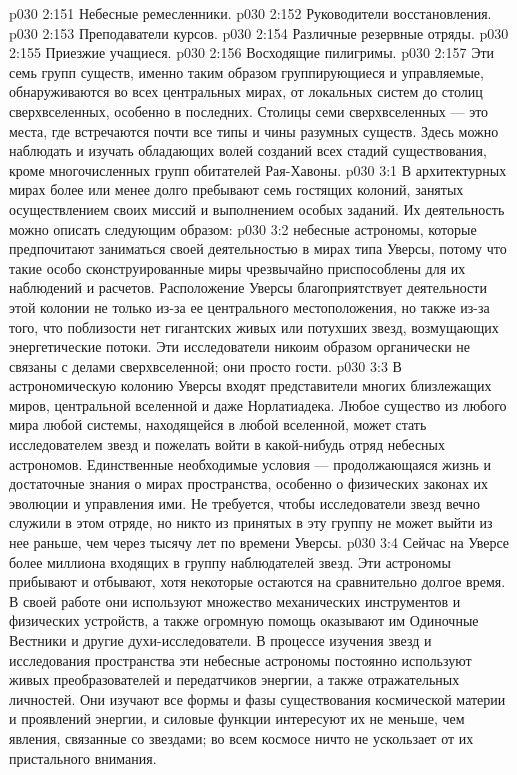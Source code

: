 \vs p030 2:151 \bibnobreakspace Небесные ремесленники.
\vs p030 2:152 \bibnobreakspace Руководители восстановления.
\vs p030 2:153 \bibnobreakspace Преподаватели курсов.
\vs p030 2:154 \bibnobreakspace Различные резервные отряды.
\vs p030 2:155 \bibnobreakspace Приезжие учащиеся.
\vs p030 2:156 \bibnobreakspace Восходящие пилигримы.
\vs p030 2:157 \pc Эти семь групп существ, именно таким образом группирующиеся и управляемые, обнаруживаются во всех центральных мирах, от локальных систем до столиц сверхвселенных, особенно в последних. Столицы семи сверхвселенных --- это места, где встречаются почти все типы и чины разумных существ. Здесь можно наблюдать и изучать обладающих волей созданий всех стадий существования, кроме многочисленных групп обитателей Рая\hyp{}Хавоны.
\vs p030 3:1 В архитектурных мирах более или менее долго пребывают семь гостящих колоний, занятых осуществлением своих миссий и выполнением особых заданий. Их деятельность можно описать следующим образом:
\vs p030 3:2 \pc {}\bibnobreakspace {} небесные астрономы, которые предпочитают заниматься своей деятельностью в мирах типа Уверсы, потому что такие особо сконструированные миры чрезвычайно приспособлены для их наблюдений и расчетов. Расположение Уверсы благоприятствует деятельности этой колонии не только из\hyp{}за ее центрального местоположения, но также из\hyp{}за того, что поблизости нет гигантских живых или потухших звезд, возмущающих энергетические потоки. Эти исследователи никоим образом органически не связаны с делами сверхвселенной; они просто гости.
\vs p030 3:3 В астрономическую колонию Уверсы входят представители многих близлежащих миров, центральной вселенной и даже Норлатиадека. Любое существо из любого мира любой системы, находящейся в любой вселенной, может стать исследователем звезд и пожелать войти в какой\hyp{}нибудь отряд небесных астрономов. Единственные необходимые условия --- продолжающаяся жизнь и достаточные знания о мирах пространства, особенно о физических законах их эволюции и управления ими. Не требуется, чтобы исследователи звезд вечно служили в этом отряде, но никто из принятых в эту группу не может выйти из нее раньше, чем через тысячу лет по времени Уверсы.
\vs p030 3:4 Сейчас на Уверсе более миллиона входящих в группу наблюдателей звезд. Эти астрономы прибывают и отбывают, хотя некоторые остаются на сравнительно долгое время. В своей работе они используют множество механических инструментов и физических устройств, а также огромную помощь оказывают им Одиночные Вестники и другие духи\hyp{}исследователи. В процессе изучения звезд и исследования пространства эти небесные астрономы постоянно используют живых преобразователей и передатчиков энергии, а также отражательных личностей. Они изучают все формы и фазы существования космической материи и проявлений энергии, и силовые функции интересуют их не меньше, чем явления, связанные со звездами; во всем космосе ничто не ускользает от их пристального внимания.
